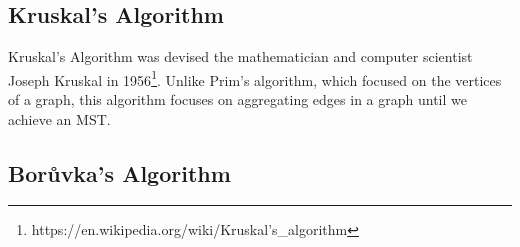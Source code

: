 \subsection{Kruskal's Algorithm}
Kruskal's Algorithm was devised the mathematician and computer scientist Joseph Kruskal in 1956\footnote{https://en.wikipedia.org/wiki/Kruskal's\_algorithm}. Unlike Prim's algorithm, which focused on the vertices of a graph, this algorithm focuses on aggregating edges in a graph until we achieve an MST. 
\subsection{Bor\r{u}vka's Algorithm}